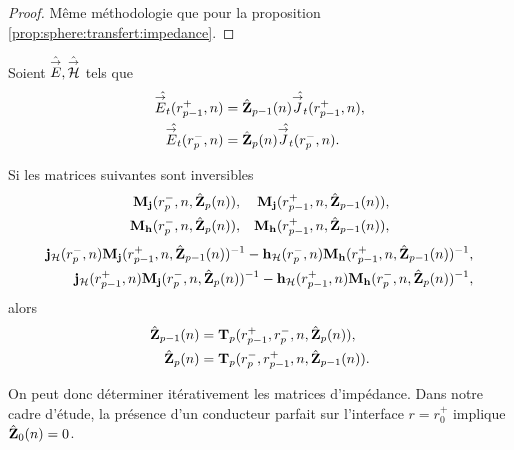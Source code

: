     \begin{proof}
      Même méthodologie que pour la proposition \ref{prop:sphere:transfert:impedance}.
    \end{proof}

    \begin{prop}%
      \label{prop:sphere:synthese:impedance}
      Soient \(\hat{{\overset{\rightarrow}{E}}},\hat{{\overset{\rightarrow}{\mathcal{H}}}}\) tels que 
      \begin{align*}
      \hat{{\overset{\rightarrow}{E}}_t}(r_{p-1}^+,n) &= \hat{\mathbf{Z}}_{p-1}(n)\hat{{\overset{\rightarrow}{J}}_t}(r_{p-1}^+,n),
      \\
      \hat{{\overset{\rightarrow}{E}}_t}(r_{p}^-,n) &= \hat{\mathbf{Z}}_{p}(n)\hat{{\overset{\rightarrow}{J}}_t}(r_{p}^-,n).
      \end{align*}

      Si les matrices suivantes sont inversibles
      \begin{align*}
        \mathbf{M}_{\mathbf{j}}(r_p^-,n,\hat{\mathbf{Z}}_{p}(n)), && \mathbf{M}_{\mathbf{j}}(r_{p-1}^+,n,\hat{\mathbf{Z}}_{p-1}(n)),
        \\
        \mathbf{M}_{\mathbf{h}}(r_p^-,n,\hat{\mathbf{Z}}_{p}(n)), && \mathbf{M}_{\mathbf{h}}(r_{p-1}^+,n,\hat{\mathbf{Z}}_{p-1}(n)),
      \end{align*}
      \begin{align*}
        \mathbf{j}_{\mathcal{H}}(r_{p}^-,n)\mathbf{M}_{\mathbf{j}}(r_{p-1}^+,n,\hat{\mathbf{Z}}_{p-1}(n))^{-1} - \mathbf{h}_{\mathcal{H}}(r_{p}^-,n)\mathbf{M}_{\mathbf{h}}(r_{p-1}^+,n,\hat{\mathbf{Z}}_{p-1}(n))^{-1},
        \\
        \mathbf{j}_{\mathcal{H}}(r_{p-1}^+,n)\mathbf{M}_{\mathbf{j}}(r_{p}^-,n,\hat{\mathbf{Z}}_{p}(n))^{-1} - \mathbf{h}_{\mathcal{H}}(r_{p-1}^+,n)\mathbf{M}_{\mathbf{h}}(r_{p}^-,n,\hat{\mathbf{Z}}_{p}(n))^{-1},
      \end{align*}
      alors 
      \begin{align*}
        \hat{\mathbf{Z}}_{p-1}(n) &= \mathbf{T}_p(r_{p-1}^+,r_{p}^-,n,\hat{\mathbf{Z}}_{p}(n)),
        \\
        \hat{\mathbf{Z}}_{p}(n) &= \mathbf{T}_p(r_{p}^-,r_{p-1}^+,n,\hat{\mathbf{Z}}_{p-1}(n)).
      \end{align*}

    \end{prop}

    On peut donc déterminer itérativement les matrices d'impédance. Dans notre cadre d'étude, la présence d'un conducteur parfait sur l'interface \(r=r_0^+\) implique \(\hat{\mathbf{Z}}_{0}(n) = 0\).


